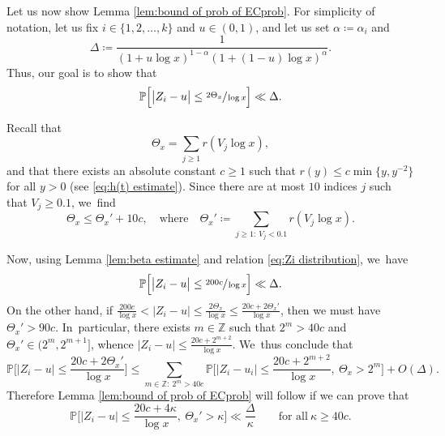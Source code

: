 \documentclass[10pt,a4paper]{article}
\newcommand{\ZZ}{\mathbb{Z}}
\newcommand{\PP}{\mathbb{P}}
\newcommand{\bg}{\big}
\newcommand{\bgg}{\Big}
\theoremstyle{plain}
\theoremstyle{definition}
\begin{document}
Let us now show Lemma \ref{lem:bound of prob of ECprob}. For simplicity of notation, let us fix $i\in\{1,2,\dots,k\}$ and $u\in(0,1)$, and let us set $\alpha \coloneqq \alpha_i$ and
\[
\Delta \coloneqq \frac{1}{(1+ u\log x)^{1-\alpha}(1+(1-u)\log x)^{\alpha}}.
\]
Thus, our goal is to show that
\begin{equation}
\label{eq:Bprob rewrite}
\PP\bgg[ \bg| Z_i - u \bg|\le \sfrac{2\Theta_x}{\log x}\bgg] \ll \Delta.
\end{equation}

Recall that
\[
\Theta_x=\sum_{j\ge1}r(V_j\log x),
\]
and that there exists an absolute constant $c\ge1$ such that $r(y)\le c \min\{y,y^{-2}\}$ for all $y>0$ (see \eqref{eq:h(t) estimate}). Since there are at most $10$ indices $j$ such that $V_j\ge 0.1$, we~find
\[
\Theta_x\le \Theta_x'+10c,\quad\text{where}\quad \Theta_x'\coloneqq \sum_{j\ge1:\ V_j<0.1}r(V_j\log x).
\]

Now, using Lemma \ref{lem:beta estimate} and relation \eqref{eq:Zi distribution}, we~have
\[
\PP\bgg[ \bg| Z_i - u \bg|\le \sfrac{200c}{\log x}\bgg] \ll \Delta.
\]
On the other hand, if $\frac{200c}{\log x}<|Z_i-u|\le \frac{2\Theta_x}{\log x}\le \frac{20c+2\Theta_x'}{\log x}$, then we must have $\Theta_x'>90c$. In~particular, there exists $m\in\ZZ$ such that $2^m>40c$ and $\Theta_x'\in(2^m,2^{m+1}]$, whence $|Z_i-u|\le \frac{20c + 2^{m+2}}{\log x}$. We~thus conclude that
\[
\PP\bgg[ \bg| Z_i - u \bg|\le \frac{20c+2\Theta_x'}{\log x}\bgg] \le \sum_{m\in\ZZ:\ 2^m>40c}
\PP\bgg[ \bg| Z_i - u_i \bg|\le \frac{20c+2^{m+2}}{\log x},\ \Theta_x>2^m\bgg] + O(\Delta).
\]
Therefore Lemma \ref{lem:bound of prob of ECprob} will follow if we can prove that
\begin{equation}
\label{eq:lem Bprob reduction 1}
\PP\bgg[ \bg| Z_i - u \bg|\le \frac{20c+4\kappa}{\log x},\ \Theta_x'>\kappa \bgg] \ll \frac{\Delta}{\kappa}
\qquad\text{for all}\ \kappa\ge 40c.
\end{equation}
\end{document}
